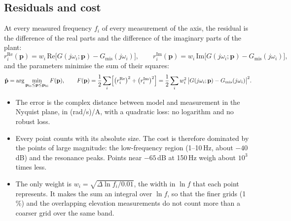 \documentclass[10pt,a4paper]{article}
\numberwithin{equation}{section}
\begin{document}
\subsection{Residuals and cost}
At every measured frequency $f_i$ of every measurement of the axis, the residual is the difference of the real parts and the difference of the imaginary parts of the plant:
\begin{equation}
r_i^{\mathrm{Re}}(\mathbf p)=w_i\,\mathrm{Re}\bigl[G(j\omega_i;\mathbf p)-G_\mathrm{mis}(j\omega_i)\bigr],\qquad
r_i^{\mathrm{Im}}(\mathbf p)=w_i\,\mathrm{Im}\bigl[G(j\omega_i;\mathbf p)-G_\mathrm{mis}(j\omega_i)\bigr],
\end{equation}
and the parameters minimise the sum of their squares:
\begin{equation}
\hat{\mathbf p}=\arg\min_{\mathbf p_\mathrm{lo}\leq\mathbf p\leq\mathbf p_\mathrm{hi}}F(\mathbf p),\qquad
F(\mathbf p)=\frac12\sum_i\Bigl[\bigl(r_i^{\mathrm{Re}}\bigr)^2+\bigl(r_i^{\mathrm{Im}}\bigr)^2\Bigr]=\frac12\sum_iw_i^2\,\bigl|G(j\omega_i;\mathbf p)-G_\mathrm{mis}(j\omega_i)\bigr|^2 .
\end{equation}
\begin{itemize}
\item The error is the complex distance between model and measurement in the Nyquist plane, in (rad/s)/A, with a quadratic loss: no logarithm and no robust loss.
\item Every point counts with its absolute size. The cost is therefore dominated by the points of large magnitude: the low-frequency region (1--10\,Hz, about $-40$\,dB) and the resonance peaks. Points near $-65$\,dB at 150\,Hz weigh about $10^3$ times less.
\item The only weight is $w_i=\sqrt{\Delta\ln f_i/0.01}$, the width in $\ln f$ that each point represents. It makes the sum an integral over $\ln f$, so that the finer grids (1\,\%) and the overlapping elevation measurements do not count more than a coarser grid over the same band.
\end{itemize}
\end{document}
